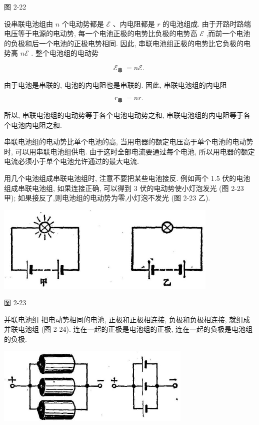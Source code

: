 \documentclass[10pt]{article}
\begin{document}
图 2-22

设串联电池组由 \(n\) 个电动势都是 \(\mathcal{E}\) 、内电阻都是 \(r\) 的电池组成. 由于开路时路端电压等于电源的电动势, 每一个电池正极的电势比负极的电势高 \(\mathcal{E}\) ,而前一个电池的负极和后一个电池的正极电势相同. 因此, 串联电池组正极的电势比它负极的电势高 \(n\mathcal{E}\) . 整个电池组的电动势

\[
{\mathcal{E}}_{\text{串 }} = n\mathcal{E}\text{. }
\]

由于电池是串联的, 电池的内电阻也是串联的. 因此, 串联电池组的内电阻

\[
{r}_{\text{串 }} = {nr}\text{. }
\]

所以, 串联电池组的电动势等于各个电池电动势之和, 串联电池组的内电阻等于各个电池内电阻之和.

串联电池组的电动势比单个电池的高, 当用电器的额定电压高于单个电池的电动势时, 可以用串联电池组供电. 由于这时全部电流要通过每个电池, 所以用电器的额定电流必须小于单个电池允许通过的最大电流.

用几个电池组成串联电池组时, 注意不要把某些电池接反. 例如两个 1.5 伏的电池组成串联电池组, 如果连接正确, 可以得到 3 伏的电动势使小灯泡发光 (图 2-23 甲); 如果接反了,则电池组的电动势为零,小灯泡不发光 (图 2-23 乙).

\begin{center}
\includegraphics[max width=0.8\textwidth]{images/01913056-1f15-74d8-9184-9aab52c9d66b_93_476775.jpg}
\end{center}

图 2-23

并联电池组 把电动势相同的电池, 正极和正极相连接, 负极和负极相连接, 就组成并联电池组 (图 2-24). 连在一起的正极是电池组的正极, 连在一起的负极是电池组的负极.

\begin{center}
\includegraphics[max width=0.7\textwidth]{images/01913056-1f15-74d8-9184-9aab52c9d66b_93_423475.jpg}
\end{center}
\end{document}

